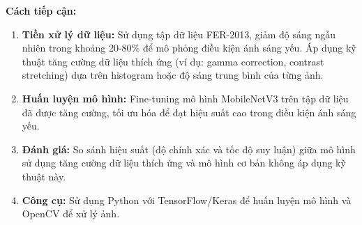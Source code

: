 \textbf{Cách tiếp cận:}  
\begin{enumerate}
    \item \textbf{Tiền xử lý dữ liệu:} Sử dụng tập dữ liệu FER-2013, giảm độ sáng ngẫu nhiên trong khoảng 20-80\% để mô phỏng điều kiện ánh sáng yếu. Áp dụng kỹ thuật tăng cường dữ liệu thích ứng (ví dụ: gamma correction, contrast stretching) dựa trên histogram hoặc độ sáng trung bình của từng ảnh.
    \item \textbf{Huấn luyện mô hình:} Fine-tuning mô hình MobileNetV3 trên tập dữ liệu đã được tăng cường, tối ưu hóa để đạt hiệu suất cao trong điều kiện ánh sáng yếu.
    \item \textbf{Đánh giá:} So sánh hiệu suất (độ chính xác và tốc độ suy luận) giữa mô hình sử dụng tăng cường dữ liệu thích ứng và mô hình cơ bản không áp dụng kỹ thuật này.
    \item \textbf{Công cụ:} Sử dụng Python với TensorFlow/Keras để huấn luyện mô hình và OpenCV để xử lý ảnh.
\end{enumerate}